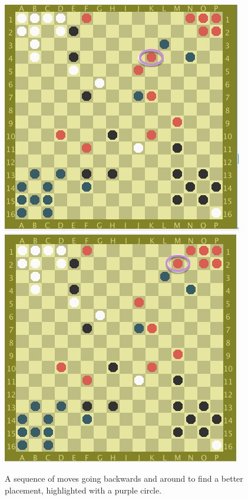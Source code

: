 \documentclass[paper=a4, fontsize=11pt]{scrartcl}
\numberwithin{equation}{section}		%
\numberwithin{figure}{section}			%
\numberwithin{table}{section}				%
\begin{document}
\begin{figure}[h!]
\includegraphics[scale=.2]{4}
\includegraphics[scale=.2]{5}
\caption{A sequence of moves going backwards and around to find a better placement, highlighted with a purple circle.}
\end{figure}
\end{document}
